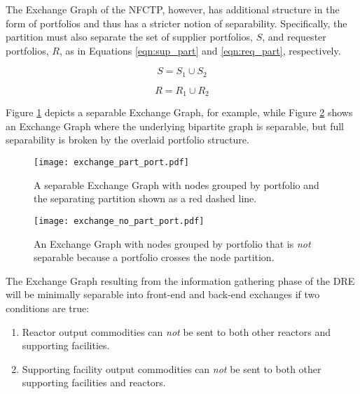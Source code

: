 The Exchange Graph of the NFCTP, however, has additional structure in the form
of portfolios and thus has a stricter notion of separability. Specifically, the
partition must also separate the set of supplier portfolios, $S$, and requester
portfolios, $R$, as in Equations \ref{eqn:sup_part} and \ref{eqn:req_part},
respectively.

\begin{equation}\label{eqn:sup_part}
  S = S_{1} \cup S_{2}
\end{equation}

\begin{equation}\label{eqn:req_part}
  R = R_{1} \cup R_{2}
\end{equation}

Figure \ref{fig:port_part} depicts a separable Exchange Graph, for example,
while Figure \ref{fig:port_no_part} shows an Exchange Graph where the underlying
bipartite graph is separable, but full separability is broken by the overlaid
portfolio structure.

\begin{figure}
  \begin{center}
    \texttt{[image: exchange\_part\_port.pdf]}
    \caption[]{
      \label{fig:port_part}
      A separable Exchange Graph with nodes grouped by portfolio and the
      separating partition shown as a red dashed line.}
  \end{center}
\end{figure}

\begin{figure}
  \begin{center}
    \texttt{[image: exchange\_no\_part\_port.pdf]}
    \caption[]{
      \label{fig:port_no_part}
      An Exchange Graph with nodes grouped by portfolio that is \textit{not}
      separable because a portfolio crosses the node partition.}
  \end{center}
\end{figure}

The Exchange Graph resulting from the information gathering phase of the DRE
will be minimally separable into front-end and back-end exchanges if two
conditions are true:

\begin{enumerate}
  \item Reactor output commodities can \textit{not} be sent to both other
    reactors and supporting facilities.

  \item Supporting facility output commodities can \textit{not} be sent to both
    other supporting facilities and reactors.
\end{enumerate}


